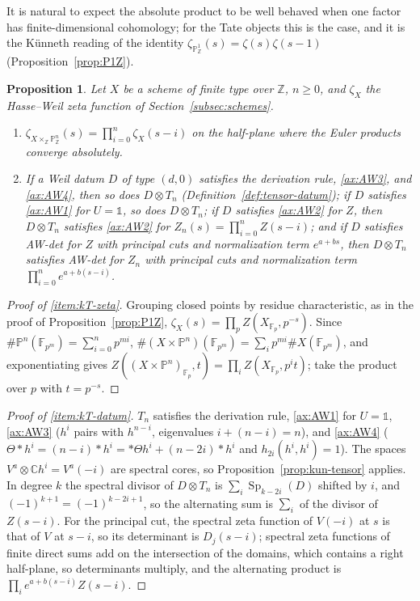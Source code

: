 \documentclass[11pt]{amsart}
\theoremstyle{plain}
\newtheorem{proposition}[theorem]{Proposition}
\theoremstyle{definition}
\theoremstyle{remark}
\numberwithin{equation}{section}
\newcommand{\C}{\mathbb{C}}
\newcommand{\Z}{\mathbb{Z}}
\newcommand{\F}{\mathbb{F}}
\begin{document}
It is natural to expect the absolute product to be well behaved when one
factor has finite-dimensional cohomology; for the Tate objects this is
the case, and it is the K\"unneth reading of the identity
$\zeta_{\mathbb{P}^1_\Z}(s)=\zeta(s)\zeta(s-1)$
(Proposition~\ref{prop:P1Z}).

\begin{proposition}\label{prop:kun-tate}
Let $X$ be a scheme of finite type over $\Z$, $n\ge0$, and $\zeta_X$ the
Hasse--Weil zeta function of Section~\ref{subsec:schemes}.
\begin{enumerate}[label=(\roman*)]
\item\label{item:kT-zeta} $\zeta_{X\times_\Z\mathbb{P}^n_\Z}(s)=
  \prod_{i=0}^n\zeta_X(s-i)$ on the half-plane where the Euler products
  converge absolutely.
\item\label{item:kT-datum} If a Weil datum $D$ of type $(d,0)$ satisfies
  the derivation rule, \ref{ax:AW3}, and \ref{ax:AW4}, then so does
  $D\otimes T_n$ (Definition~\ref{def:tensor-datum}); if $D$ satisfies
  \ref{ax:AW1} for $U=\mathbb 1$, so does $D\otimes T_n$; if $D$
  satisfies \ref{ax:AW2} for $Z$, then $D\otimes T_n$ satisfies
  \ref{ax:AW2} for $Z_n(s)=\prod_{i=0}^nZ(s-i)$; and if $D$ satisfies
  AW-det for $Z$ with principal cuts and normalization term
  $e^{a+bs}$, then $D\otimes T_n$ satisfies AW-det for $Z_n$ with
  principal cuts and normalization term $\prod_{i=0}^ne^{a+b(s-i)}$.
\end{enumerate}
\end{proposition}

\begin{proof}[Proof of \ref{item:kT-zeta}]
Grouping closed points by residue characteristic, as in the proof of
Proposition~\ref{prop:P1Z}, $\zeta_X(s)=\prod_pZ(X_{\F_p},p^{-s})$.
Since $\#\mathbb{P}^n(\F_{p^m})=\sum_{i=0}^np^{mi}$,
$\#(X\times\mathbb{P}^n)(\F_{p^m})=\sum_ip^{mi}\#X(\F_{p^m})$, and
exponentiating gives $Z((X\times\mathbb{P}^n)_{\F_p},t)=\prod_iZ(X_{\F_p},
p^it)$; take the product over $p$ with $t=p^{-s}$.
\end{proof}

\begin{proof}[Proof of \ref{item:kT-datum}]
$T_n$ satisfies the derivation rule, \ref{ax:AW1} for $U=\mathbb 1$,
\ref{ax:AW3} ($h^i$ pairs with $h^{n-i}$, eigenvalues $i+(n-i)=n$), and
\ref{ax:AW4} ($\Theta*h^i=(n-i)*h^i=*\Theta h^i+(n-2i)*h^i$ and
$h_{2i}(h^i,h^i)=1$). The spaces $V^a\otimes\C h^i=V^a(-i)$ are spectral
cores, so Proposition~\ref{prop:kun-tensor} applies. In degree $k$ the
spectral divisor of $D\otimes T_n$ is $\sum_i\operatorname{Sp}_{k-2i}
(D)$ shifted by $i$, and $(-1)^{k+1}=(-1)^{k-2i+1}$, so the alternating
sum is $\sum_i$ of the divisor of $Z(s-i)$. For the principal cut, the
spectral zeta function of $V(-i)$ at $s$ is that of $V$ at $s-i$, so its
determinant is $D_j(s-i)$; spectral zeta functions of finite direct
sums add on the intersection of the domains, which contains a
right half-plane, so determinants multiply, and the alternating product
is $\prod_ie^{a+b(s-i)}Z(s-i)$.
\end{proof}
\end{document}
